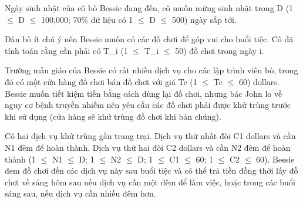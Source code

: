 Ngày sinh nhật của cô bò Bessie đang đến, cô muốn mừng sinh nhật trong D (1  $\le$  D  $\le$  100,000; 70\% dữ liệu có 1  $\le$  D  $\le$  500) ngày sắp tới.  

   Đàn bò ít chú ý nên Bessie muốn có các đồ chơi để góp vui cho buổi tiệc. Cô đã tính toán rằng cần phải có T\_i (1  $\le$  T\_i  $\le$  50) đồ chơi trong ngày i.  

   Trường mẫu giáo của Bessie có rất nhiều dịch vụ cho các lập trình viên bò, trong đó có một cửa hàng đồ chơi bán đồ chơi với giá Tc (1  $\le$  Tc  $\le$  60) dollars. Bessie muốn tiết kiệm tiền bằng cách dùng lại đồ chơi, nhưng bác John lo về nguy cơ bệnh truyền nhiễm nên yêu cầu các đồ chơi phải được khử trùng trước khi sử dụng (cửa hàng sẽ khử trùng đồ chơi khi bán chúng).  

   Có hai dịch vụ khử trùng gần trang trại. Dịch vụ thứ nhất đòi C1 dollars và cần N1 đêm để hoàn thành. Dịch vụ thứ hai đòi C2 dollars và cần N2 đêm để hoàn thành (1  $\le$  N1  $\le$  D; 1  $\le$  N2  $\le$  D; 1  $\le$  C1  $\le$  60; 1  $\le$  C2  $\le$  60). Bessie đem đồ chơi đến các dịch vụ này sau buổi tiệc và có thể trả tiền đồng thời lấy đồ chơi về sáng hôm sau nếu dịch vụ cần một đêm để làm việc, hoặc trong các buổi sáng sau, nếu dịch vụ cần nhiều đêm hơn.